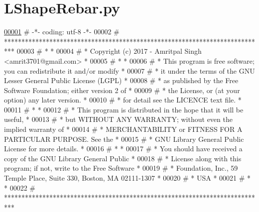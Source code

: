 \hypertarget{LShapeRebar_8py_source}{}\section{L\+Shape\+Rebar.\+py}

\begin{DoxyCode}
\hypertarget{LShapeRebar_8py_source.tex_l00001}{}\hyperlink{namespaceLShapeRebar}{00001} \textcolor{comment}{# -*- coding: utf-8 -*-}
00002 \textcolor{comment}{# ***************************************************************************}
00003 \textcolor{comment}{# *                                                                         *}
00004 \textcolor{comment}{# *   Copyright (c) 2017 - Amritpal Singh <amrit3701@gmail.com>             *}
00005 \textcolor{comment}{# *                                                                         *}
00006 \textcolor{comment}{# *   This program is free software; you can redistribute it and/or modify  *}
00007 \textcolor{comment}{# *   it under the terms of the GNU Lesser General Public License (LGPL)    *}
00008 \textcolor{comment}{# *   as published by the Free Software Foundation; either version 2 of     *}
00009 \textcolor{comment}{# *   the License, or (at your option) any later version.                   *}
00010 \textcolor{comment}{# *   for detail see the LICENCE text file.                                 *}
00011 \textcolor{comment}{# *                                                                         *}
00012 \textcolor{comment}{# *   This program is distributed in the hope that it will be useful,       *}
00013 \textcolor{comment}{# *   but WITHOUT ANY WARRANTY; without even the implied warranty of        *}
00014 \textcolor{comment}{# *   MERCHANTABILITY or FITNESS FOR A PARTICULAR PURPOSE.  See the         *}
00015 \textcolor{comment}{# *   GNU Library General Public License for more details.                  *}
00016 \textcolor{comment}{# *                                                                         *}
00017 \textcolor{comment}{# *   You should have received a copy of the GNU Library General Public     *}
00018 \textcolor{comment}{# *   License along with this program; if not, write to the Free Software   *}
00019 \textcolor{comment}{# *   Foundation, Inc., 59 Temple Place, Suite 330, Boston, MA  02111-1307  *}
00020 \textcolor{comment}{# *   USA                                                                   *}
00021 \textcolor{comment}{# *                                                                         *}
00022 \textcolor{comment}{# ***************************************************************************}

\end{DoxyCode}
